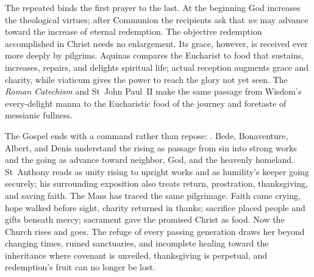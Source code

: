 The repeated  binds the first prayer to the last. At the
beginning God increases the theological virtues; after Communion the recipients
ask that \emph{we} may advance toward the increase of eternal redemption. The
objective redemption accomplished in Christ needs no enlargement. Its grace,
however, is received ever more deeply by pilgrims. Aquinas compares the
Eucharist to food that sustains, increases, repairs, and delights spiritual
life; actual reception augments grace and charity, while viaticum gives the
power to reach the glory not yet seen. The \emph{Roman Catechism} and
St~John Paul~II make the same passage from Wisdom's every-delight manna to the
Eucharistic food of the journey and foretaste of messianic fullness.

The Gospel ends with a command rather than repose: . Bede,
Bonaventure, Albert, and Denis understand the rising as passage from sin into
strong works and the going as advance toward neighbor, God, and the heavenly
homeland. St~Anthony reads  as unity rising to upright works and
 as humility's keeper going securely; his surrounding exposition
also treats return, prostration, thanksgiving, and saving faith. The Mass has traced the same pilgrimage. Faith came
crying, hope walked before sight, charity returned in thanks; sacrifice placed
people and gifts beneath mercy; sacrament gave the promised Christ as food.
Now the Church rises and goes. The refuge of every passing generation draws
her beyond changing times, ruined sanctuaries, and incomplete healing toward
the inheritance where covenant is unveiled, thanksgiving is perpetual, and
redemption's fruit can no longer be lost.

\endgroup

\label{triptych:brief-synthesis:end}
\clearpage
